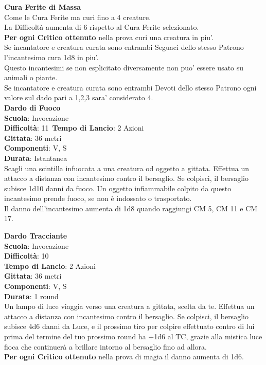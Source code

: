\begin{multicols}{2}
\medskip\textbf{Cura Ferite di Massa}\\
Come le Cura Ferite ma curi fino a 4 creature.\\
La Difficoltà aumenta di 6 rispetto al Cura Ferite selezionato.\\
\textbf{Per ogni Critico ottenuto} nella prova curi una creatura in piu'.\\
Se incantatore e creatura curata sono entrambi Seguaci dello stesso Patrono l'incantesimo cura 1d8 in piu'.\\
Questo incantesimi se non esplicitato diversamente non puo' essere usato su animali o piante.\\
Se incantatore e creatura curata sono entrambi Devoti dello stesso Patrono ogni valore sul dado pari a 1,2,3 sara' considerato 4.\\

\medskip\textbf{Dardo di Fuoco}\\
\textbf{Scuola}: Invocazione\\
\textbf{Difficoltà}: 11\
\textbf{Tempo di Lancio}: 2 Azioni\\
\textbf{Gittata}: 36 metri\\
\textbf{Componenti}: V, S\\
\textbf{Durata}: Istantanea\\
Scagli una scintilla infuocata a una creatura od oggetto a gittata. Effettua un attacco a distanza con incantesimo contro il bersaglio. Se colpisci, il bersaglio subisce 1d10 danni da fuoco. Un oggetto infiammabile colpito da questo incantesimo prende fuoco, se non è indossato o trasportato.\\
Il danno dell'incantesimo aumenta di 1d8 quando raggiungi CM 5, CM 11 e CM 17.

\medskip\textbf{Dardo Tracciante}\\
\textbf{Scuola}: Invocazione\\
\textbf{Difficoltà}: 10\\
\textbf{Tempo di Lancio}: 2 Azioni\\
\textbf{Gittata}: 36 metri\\
\textbf{Componenti}: V, S\\
\textbf{Durata}: 1 round\\
Un lampo di luce viaggia verso una creatura a gittata, scelta da te. Effettua un attacco a distanza con incantesimo contro il bersaglio. Se colpisci, il bersaglio subisce 4d6 danni da Luce, e il prossimo tiro per colpire effettuato contro di lui prima del termine del tuo
prossimo round ha +1d6 al TC, grazie alla mistica luce fioca che continuerà a brillare intorno al bersaglio fino ad allora.\\
\textbf{Per ogni Critico ottenuto} nella prova di magia il danno aumenta di 1d6.


\end{multicols}
